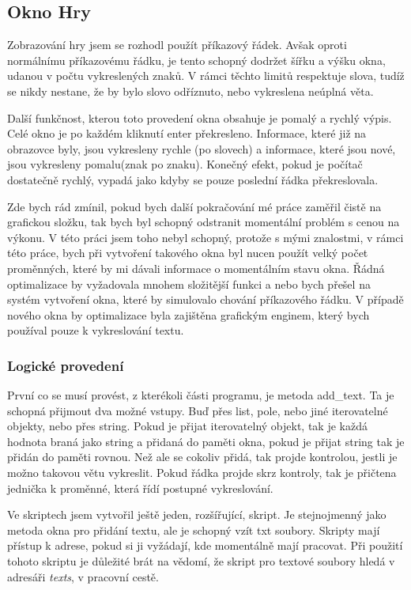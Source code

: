 \documentclass[12pt,a4paper]{article}
\begin{document}
\subsection{Okno Hry}
Zobrazování hry jsem se rozhodl použít příkazový řádek. Avšak oproti normálnímu příkazovému řádku, je tento schopný dodržet šířku a výšku okna, udanou v počtu vykreslených znaků. V rámci těchto limitů respektuje slova, tudíž se nikdy nestane, že by bylo slovo odříznuto, nebo vykreslena neúplná věta.

Další funkčnost, kterou toto provedení okna obsahuje je pomalý a rychlý výpis. Celé okno je po každém kliknutí enter překresleno. Informace, které již na obrazovce byly, jsou vykresleny rychle (po slovech) a informace, které jsou nové, jsou vykresleny pomalu(znak po znaku). Konečný efekt, pokud je počítač dostatečně rychlý, vypadá jako kdyby se pouze poslední řádka překreslovala. 

Zde bych rád zmínil, pokud bych další pokračování mé práce zaměřil čistě na grafickou složku, tak bych byl schopný odstranit momentální problém s cenou na výkonu. V této práci jsem toho nebyl schopný, protože s mými znalostmi, v rámci této práce, bych při vytvoření takového okna byl nucen použít velký počet proměnných, které by mi dávali informace o momentálním stavu okna. Řádná optimalizace by vyžadovala mnohem složitější funkci a nebo bych přešel na systém vytvoření okna, které by simulovalo chování příkazového řádku. V případě nového okna by optimalizace byla zajištěna grafickým enginem, který bych používal pouze k vykreslování textu.
\subsubsection{Logické provedení}
První co se musí provést, z kterékoli části programu, je metoda add\_text. Ta je schopná přijmout dva možné vstupy. Buď přes list, pole, nebo jiné iterovatelné objekty, nebo přes string. Pokud je přijat iterovatelný objekt, tak je každá hodnota braná jako string a přidaná do paměti okna, pokud je přijat string tak je přidán do paměti rovnou. Než ale se cokoliv přidá, tak projde kontrolou, jestli je možno takovou větu vykreslit. Pokud řádka projde skrz kontroly, tak je přičtena jednička k proměnné, která řídí postupné vykreslování.

Ve skriptech jsem vytvořil ještě jeden, rozšířující, skript. Je stejnojmenný jako metoda okna pro přidání textu, ale je schopný vzít txt soubory. Skripty mají přístup k adrese, pokud si ji vyžádají, kde momentálně mají pracovat. Při použití tohoto skriptu je důležité brát na vědomí, že skript pro textové soubory hledá v adresáři \textit{texts}, v pracovní cestě.
\end{document}
